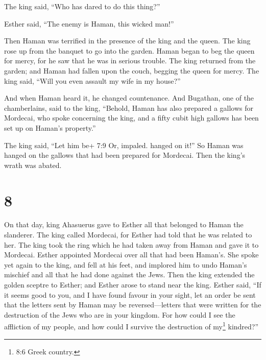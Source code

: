  The king said, ``Who has dared to do this thing?''

 Esther said, ``The enemy is Haman, this wicked man!''

Then Haman was terrified in the presence of the king and the queen.
 The king rose up from the banquet to go into the garden.
Haman began to beg the queen for mercy, for he saw that he was in
serious trouble.  The king returned from the garden; and
Haman had fallen upon the couch, begging the queen for mercy. The king
said, ``Will you even assault my wife in my house?''

And when Haman heard it, he changed countenance.  And
Bugathan, one of the chamberlains, said to the king, ``Behold, Haman has
also prepared a gallows for Mordecai, who spoke concerning the king, and
a fifty cubit high gallows has been set up on Haman's property.''

The king said, ``Let him be+ 7:9 Or, impaled. hanged on it!''
 So Haman was hanged on the gallows that had been prepared
for Mordecai. Then the king's wrath was abated.

\hypertarget{section-7}{%
\section{8}\label{section-7}}

 On that day, king Ahasuerus gave to Esther all that
belonged to Haman the slanderer. The king called Mordecai, for Esther
had told that he was related to her.  The king took the ring
which he had taken away from Haman and gave it to Mordecai. Esther
appointed Mordecai over all that had been Haman's.  She
spoke yet again to the king, and fell at his feet, and implored him to
undo Haman's mischief and all that he had done against the Jews.
 Then the king extended the golden sceptre to Esther; and
Esther arose to stand near the king.  Esther said, ``If it
seems good to you, and I have found favour in your sight, let an order
be sent that the letters sent by Haman may be reversed---letters that
were written for the destruction of the Jews who are in your kingdom.
 For how could I see the affliction of my people, and how
could I survive the destruction of my\footnote{8:6 Greek country.}
kindred?''

